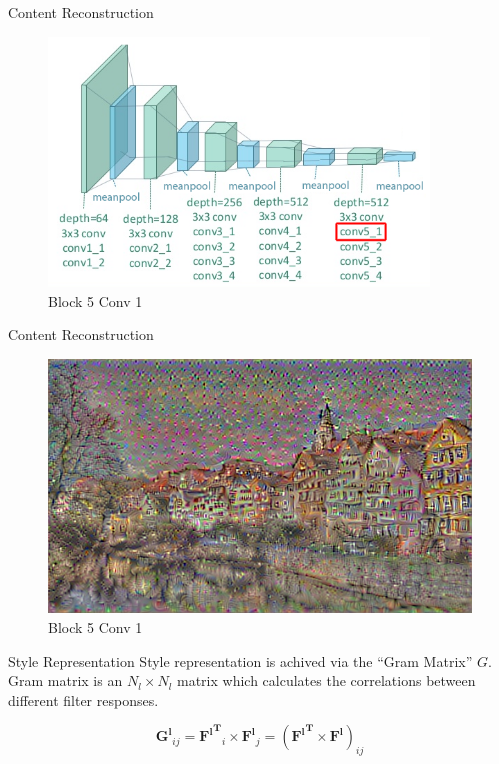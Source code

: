\documentclass{beamer}
\begin{document}
\begin{frame}{Content Reconstruction}
\begin{figure}[ht]
\centering
\caption{Block 5 Conv 1}
\includegraphics[width=0.9\textwidth]{img/vgg19/content/block5_conv1}
\end{figure}
\end{frame}
\begin{frame}{Content Reconstruction}
\begin{figure}[ht]
\centering
\caption{Block 5 Conv 1}
\includegraphics[width=\textwidth]{img/content/block5_conv1.png}
\end{figure}
\end{frame}



\begin{frame}{Style Representation}
Style representation is achived via the ``Gram Matrix'' $G$. Gram matrix is
an $N_l \times N_l$ matrix which calculates the correlations between
different filter responses.

\begin{equation}
    \mathbf{G^l}_{ij} = \mathbf{{F^l}^T}_i \times \mathbf{F^l}_j
    = (\mathbf{{F^l}^T} \times \mathbf{F^l})_{ij}
\end{equation}
\end{frame}
\end{document}
